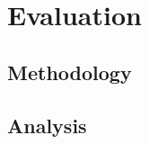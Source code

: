 \chapter{Evaluation}
\vspace{-1.6em}
%

\minitoc%
\thispagestyle{empty}
\newpage

\section{Methodology}
\section{Analysis}
